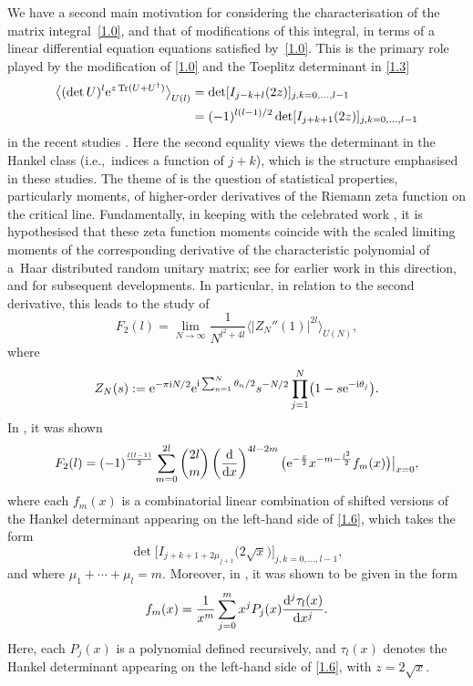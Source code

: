 \documentclass[pdftex]{sigma}
\numberwithin{equation}{section}
\theoremstyle{definition}
\begin{document}
{We have a second main motivation for considering the characterisation of the matrix integral~\eqref{1.0}, and that of modifications of this integral, in terms of
a linear differential equation equations satisfied by~\eqref{1.0}}.
This is the primary role played by the modification of \eqref{1.0} and the Toeplitz determinant in \eqref{1.3}
\begin{align}
\big \langle (\det U)^{l} {\rm e}^{z \operatorname{Tr}(U + U^\dagger)} \big \rangle_{U(l)}& = \det [ I_{j-k+l}(2z) ]_{j,k=0,\dots,l-1}\nonumber\\
&=
(-1)^{l(l-1)/2} \det [ I_{j+k+1}(2z) ]_{j,k=0,\dots,l-1} \label{1.6}
\end{align}
in the recent studies \cite{KW24a, KW24b}.
Here the second equality views the determinant in the Hankel class (i.e.,~indices a function of $j+k$), which is the structure emphasised in these studies.
The theme of \cite{KW24a, KW24b} is the question of statistical properties, particularly moments, of higher-order derivatives of the Riemann zeta function on the critical line.
Fundamentally, in keeping with the celebrated work \cite{KS00}, it is hypothesised that these zeta function moments coincide with the scaled limiting moments of the corresponding derivative of the characteristic polynomial of a~Haar distributed random unitary matrix;
see \cite{ABGS21,AKW22,B+19a,B+19, CRS06,De08,Fo22a,Hu01,Wi12} for earlier work in this direction, and
\cite{A+24,AGKW24,A+25,BW25,SW24} for subsequent developments.
In particular, in relation to the second derivative, this leads to the study of
\cite{KW24a}
\begin{equation}\label{1.8}
F_{2}(l)=\lim_{N\rightarrow \infty}\frac{1}{N^{l^2+4l}}\big \langle |Z_{N}''(1)|^{2l} \big \rangle_{U(N)},
\end{equation}
where
\[
Z_{N}(s) := {\rm e}^{-\pi {\rm i }N/2}{\rm e}^{{\rm i} \sum_{n=1}^{N}\theta_{n}/2}
s^{- N/2}\prod_{j=1}^{N}\bigl(1-s{\rm e}^{-{\rm i}\theta_{j}}\bigr).
\]
In \cite{KW24a}, it was shown
\[
F_{2}(l)=(-1)^{\frac{l(l-1)}{2}}
\sum_{m=0}^{2l} \binom{2l}{m}
\left( \frac{\rm d}{{\rm d}x} \right)^{4l-2m} \bigl( {\rm e}^{-\frac{x}{2}} x^{-m-\frac{l^2}{2} } f_{m}(x) \bigr) \big|_{x= 0},
\]
where each \( f_m(x) \) is a combinatorial linear combination of shifted versions of the Hankel determinant appearing on the left-hand side of \eqref{1.6}, which takes the form
\[
\det\big[I_{j+k+1+2\mu_{j+1}}\bigl(2\sqrt{x}\bigr)\big]_{j,k=0,\ldots,l-1},
\]
and where \( \mu_1 + \cdots + \mu_l = m \). Moreover, in \cite{KW24b}, it was shown to be given in the form
\[
f_{m}(x)=\frac{1}{x^{m}}\sum_{j=0}^{m}x^{j}P_{j}(x)\frac{{\rm d}^{j}\tau_{l}(x)}{{\rm d}x^{j}}.
\]
Here, each \( P_j(x) \) is a polynomial defined recursively, and \( \tau_l(x) \) denotes the Hankel determinant appearing on the left-hand side of \eqref{1.6}, with \( z = 2\sqrt{x} \).
\end{document}
